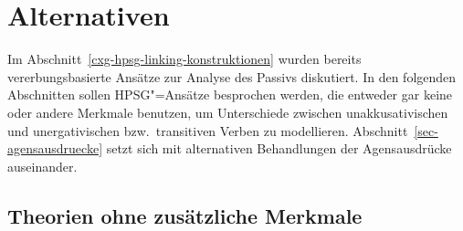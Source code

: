 {\section{Alternativen}

Im Abschnitt~\ref{cxg-hpsg-linking-konstruktionen} wurden bereits vererbungsbasierte Ansätze zur
Analyse des Passivs diskutiert. In den folgenden Abschnitten sollen HPSG"=Ansätze besprochen werden,
die entweder gar keine oder andere Merkmale benutzen, um Unterschiede zwischen unakkusativischen und
unergativischen bzw.\ transitiven Verben zu modellieren. Abschnitt~\ref{sec-agensausdruecke} setzt
sich mit alternativen Behandlungen der Agensausdrücke auseinander.

\subsection{Theorien ohne zusätzliche Merkmale}





}
